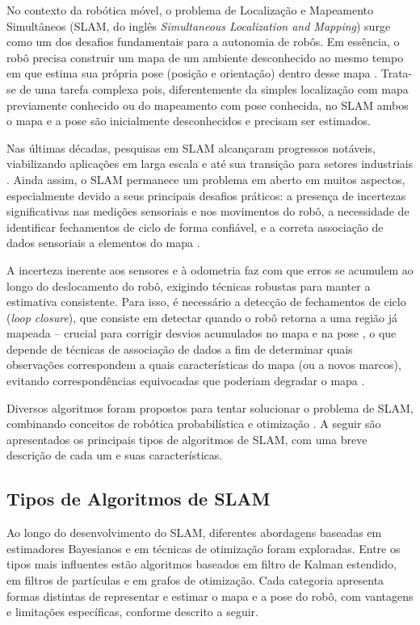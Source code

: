 No contexto da robótica móvel, o problema de Localização e Mapeamento Simultâneos (SLAM, do inglês \textit{Simultaneous Localization and Mapping}) surge como um dos desafios fundamentais para a autonomia de robôs. Em essência, o robô precisa construir um mapa de um ambiente desconhecido ao mesmo tempo em que estima sua própria pose (posição e orientação) dentro desse mapa \cite{Thrun2005}. Trata-se de uma tarefa complexa pois, diferentemente da simples localização com mapa previamente conhecido ou do mapeamento com pose conhecida, no SLAM ambos o mapa e a pose são inicialmente desconhecidos e precisam ser estimados\cite{Thrun2005}. 

Nas últimas décadas, pesquisas em SLAM alcançaram progressos notáveis, viabilizando aplicações em larga escala e até sua transição para setores industriais \cite{Cadena2016}. Ainda assim, o SLAM permanece um problema em aberto em muitos aspectos, especialmente devido a seus principais desafios práticos: a presença de incertezas significativas nas medições sensoriais e nos movimentos do robô, a necessidade de identificar fechamentos de ciclo de forma confiável, e a correta associação de dados sensoriais a elementos do mapa \cite{Thrun2005}\cite{Labbe2014}.

A incerteza inerente aos sensores e à odometria faz com que erros se acumulem ao longo do deslocamento do robô, exigindo técnicas robustas para manter a estimativa consistente. Para isso, é necessário a detecção de fechamentos de ciclo (\textit{loop closure}), que consiste em detectar quando o robô retorna a uma região já mapeada – crucial para corrigir desvios acumulados no mapa e na pose \cite{Labbe2014}, o que depende de técnicas de associação de dados a fim de determinar quais observações correspondem a quais características do mapa (ou a novos marcos), evitando correspondências equivocadas que poderiam degradar o mapa \cite{Cadena2016}.

Diversos algoritmos foram propostos para tentar solucionar o problema de SLAM, combinando conceitos de robótica probabilística e otimização \cite{Thrun2005}\cite{Cadena2016}. A seguir são apresentados os principais tipos de algoritmos de SLAM, com uma breve descrição de cada um e suas características.

    \subsection{Tipos de Algoritmos de SLAM}
    
    Ao longo do desenvolvimento do SLAM, diferentes abordagens baseadas em estimadores Bayesianos e em técnicas de otimização foram exploradas. Entre os tipos mais influentes estão algoritmos baseados em filtro de Kalman estendido, em filtros de partículas e em grafos de otimização. Cada categoria apresenta formas distintas de representar e estimar o mapa e a pose do robô, com vantagens e limitações específicas, conforme descrito a seguir.
    
